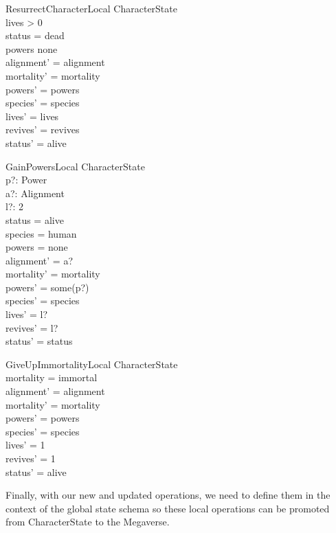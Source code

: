 \documentclass{article}
\begin{document}
\begin{schema}{ResurrectCharacterLocal}
\Delta CharacterState \\
\where
lives > 0 \\
status = dead \\
powers \neq none \\ 
alignment' = alignment \\
mortality' = mortality \\
powers' = powers \\ 
species' = species \\
lives' = lives \\
revives' = revives \\
status' = alive \\
\end{schema}

\begin{schema}{GainPowersLocal}
\Delta CharacterState \\
p?: Power \\
a?: Alignment \\
l?: 2  \\
\where
status = alive \\ 
species = human \\
powers = none \\
alignment' = a? \\
mortality' = mortality \\
powers' = some(p?) \\ 
species' = species \\
lives' = l? \\
revives' = l? \\
status' = status \\
\end{schema}

\begin{schema}{GiveUpImmortalityLocal}
\Delta CharacterState \\
\where
mortality = immortal \\
alignment' = alignment \\
mortality' = mortality \\
powers' = powers \\ 
species' = species \\
lives' = 1 \\
revives' = 1 \\
status' = alive \\
\end{schema}

\hspace{-0.7cm} Finally, with our new and updated operations, we need to define them in the context of the global state schema so these local operations can be promoted from CharacterState to the Megaverse.
\end{document}
